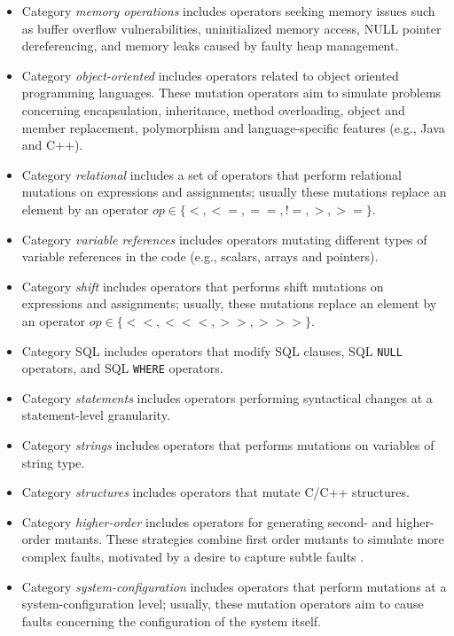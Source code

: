 \begin{itemize}
\item Category \emph{memory operations} includes operators seeking memory issues such as buffer overflow vulnerabilities, uninitialized memory access, NULL pointer dereferencing, and memory leaks caused by faulty heap management.
\item Category \emph{object-oriented} includes operators related to object oriented programming languages. These mutation operators aim to simulate problems concerning encapsulation, inheritance, method overloading, object and member replacement, polymorphism and language-specific features (e.g., Java and C++).
\item Category \emph{relational} includes a set of operators that perform relational mutations on expressions and assignments; usually these mutations replace an element by an operator $op \in \{<, <=, ==, !=, >, >=\}$.
\item Category \emph{variable references} includes operators mutating different types of variable references in the code (e.g., scalars, arrays and pointers).
\item Category \emph{shift} includes operators that performs shift mutations on expressions and assignments; usually, these mutations replace an element by an operator $op \in \{<<, <<<, >>, >>>\}$.
\item Category SQL includes operators that modify SQL clauses, SQL \texttt{NULL} operators, and SQL \texttt{WHERE} operators.
\item Category \emph{statements} includes operators performing syntactical changes at a statement-level granularity.
\item Category \emph{strings} includes operators that performs mutations on variables of string type.
\item Category \emph{structures} includes operators that mutate C/C++ structures.
\item Category \emph{higher-order} includes operators for generating second- and higher-order mutants. These strategies combine first order mutants to simulate more complex faults, motivated by a desire to capture subtle faults \cite{jia2009higher}. 
\item Category \emph{system-configuration} includes operators that perform mutations at a system-configuration level; usually, these mutation operators aim to cause faults concerning the configuration of the system itself.

\end{itemize}
